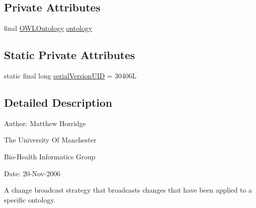 \subsection*{Private Attributes}
\begin{DoxyCompactItemize}
\item 
final \hyperlink{interfaceorg_1_1semanticweb_1_1owlapi_1_1model_1_1_o_w_l_ontology}{O\-W\-L\-Ontology} \hyperlink{classorg_1_1semanticweb_1_1owlapi_1_1model_1_1_specific_ontology_change_broadcast_strategy_af4b0b8748c0a20d8b82094032336d6d4}{ontology}
\end{DoxyCompactItemize}
\subsection*{Static Private Attributes}
\begin{DoxyCompactItemize}
\item 
static final long \hyperlink{classorg_1_1semanticweb_1_1owlapi_1_1model_1_1_specific_ontology_change_broadcast_strategy_a4f70d4145b1ea20855f1ba0eb9a5a7e7}{serial\-Version\-U\-I\-D} = 30406\-L
\end{DoxyCompactItemize}


\subsection{Detailed Description}
Author\-: Matthew Horridge\par
 The University Of Manchester\par
 Bio-\/\-Health Informatics Group\par
 Date\-: 20-\/\-Nov-\/2006\par
\par


A change broadcast strategy that broadcasts changes that have been applied to a specific ontology. 

